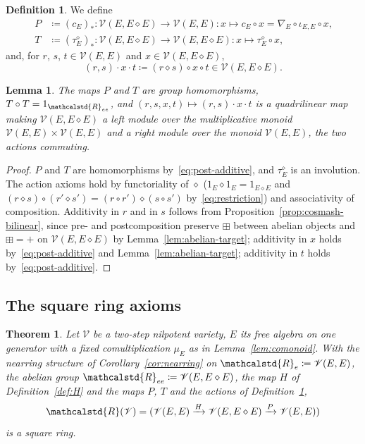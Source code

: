 \documentclass[reqno,a4paper]{amsart}
\theoremstyle{plain}
\newtheorem{theorem}[subsection]{Theorem}
\newtheorem{lemma}[subsection]{Lemma}
\theoremstyle{definition}
\newtheorem{definition}[subsection]{Definition}
\newcommand{\DefEq}{\coloneq}
\newcommand{\V}{\ensuremath{\mathcal{V}}}
\newcommand{\R}{\ensuremath{\mathcalstd{R}}}
\newcommand{\cosmash}{\ensuremath{\diamond}}
\newcommand{\cc}[1]{\ensuremath{c_{#1}}}                    %
\newcommand{\swc}[1]{\ensuremath{\tau^{\cosmash}_{#1}}}          %
\newcommand{\fold}[1]{\ensuremath{\nabla_{#1}}}            %
\newcommand{\sqring}[4]{\ensuremath{(#1\xrightarrow{#3}#2\xrightarrow{#4}#1)}}
\renewcommand{\Re}{\ensuremath{\R_{e}}}
\newcommand{\Ree}{\ensuremath{\R_{ee}}}
\begin{document}
\begin{definition}\label{def:PT-actions}
  We define
  \begin{align*}
    P & \DefEq(\cc{E})_{*}\colon \V(E,E\cosmash E)\to\V(E,E)\colon x\mapsto\cc{E}\circ x=\fold{E}\circ\iota_{E,E}\circ x\text{,} \\
    T & \DefEq(\swc{E})_{*}\colon \V(E,E\cosmash E)\to\V(E,E\cosmash E)\colon x\mapsto\swc{E}\circ x\text{,}
  \end{align*}
  and, for \(r\), \(s\), \(t\in\V(E,E)\) and \(x\in\V(E,E\cosmash E)\),
  \[
    (r,s)\cdot x\cdot t\DefEq(r\cosmash s)\circ x\circ t\in\V(E,E\cosmash E)\text{.}
  \]
\end{definition}

\begin{lemma}\label{lem:PT-actions}
  The maps \(P\) and \(T\) are group homomorphisms, \(T\circ T=1_{\Ree}\), and \((r,s,x,t)\mapsto(r,s)\cdot x\cdot t\) is a quadrilinear map making \(\V(E,E\cosmash E)\) a left module over the multiplicative monoid \(\V(E,E)\times\V(E,E)\) and a right module over the monoid \(\V(E,E)\), the two actions commuting.
\end{lemma}

\begin{proof}
  \(P\) and \(T\) are homomorphisms by~\eqref{eq:post-additive}, and \(\swc{E}\) is an involution. The action axioms hold by functoriality of \(\cosmash\) (\(1_{E}\cosmash 1_{E}=1_{E\cosmash E}\) and \((r\cosmash s)\circ(r'\cosmash s')=(r\circ r')\cosmash(s\circ s')\) by~\eqref{eq:restriction}) and associativity of composition. Additivity in \(r\) and in \(s\) follows from Proposition~\ref{prop:cosmash-bilinear}, since pre- and postcomposition preserve \(\boxplus\) between abelian objects and \(\boxplus=+\) on \(\V(E,E\cosmash E)\) by Lemma~\ref{lem:abelian-target}; additivity in \(x\) holds by~\eqref{eq:post-additive} and Lemma~\ref{lem:abelian-target}; additivity in \(t\) holds by~\eqref{eq:post-additive}.
\end{proof}

\subsection{The square ring axioms}\label{sec:square-ring-axioms}

\begin{theorem}\label{thm:square-ring-of-V}
  Let \(\V\) be a two-step nilpotent variety, \(E\) its free algebra on one generator with a fixed comultiplication \(\mu_{E}\) as in Lemma~\ref{lem:comonoid}. With the nearring structure of Corollary~\ref{cor:nearring} on \(\Re\DefEq\V(E,E)\), the abelian group \(\Ree\DefEq\V(E,E\cosmash E)\), the map \(H\) of Definition~\ref{def:H} and the maps \(P\), \(T\) and the actions of Definition~\ref{def:PT-actions},
  \[
    \R(\V)=\sqring{\V(E,E)}{\V(E,E\cosmash E)}{H}{P}
  \]
  is a square ring.
\end{theorem}
\end{document}
